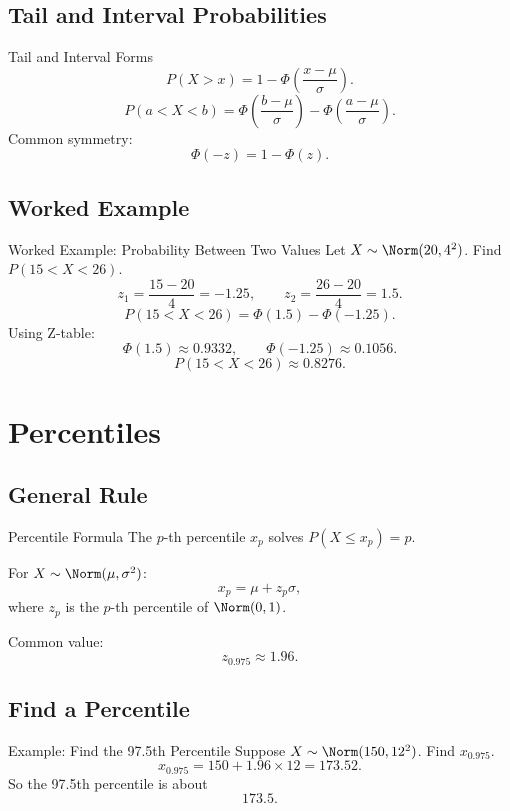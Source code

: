 \documentclass[aspectratio=169]{beamer}
\begin{document}
\subsection{Tail and Interval Probabilities}
\begin{frame}{Tail and Interval Forms}
  \[
    P(X>x)=1-\Phi\!\left(\frac{x-\mu}{\sigma}\right).
  \]
  \[
    P(a<X<b)=\Phi\!\left(\frac{b-\mu}{\sigma}\right)-\Phi\!\left(\frac{a-\mu}{\sigma}\right).
  \]
  \vspace{2mm}
  Common symmetry:
  \[
    \Phi(-z)=1-\Phi(z).
  \]
\end{frame}

\subsection{Worked Example}
\begin{frame}{Worked Example: Probability Between Two Values}
  Let \(X\sim\Norm(20,4^2)\). Find \(P(15<X<26)\).
  \[
    z_1=\frac{15-20}{4}=-1.25,\qquad z_2=\frac{26-20}{4}=1.5.
  \]
  \[
    P(15<X<26)=\Phi(1.5)-\Phi(-1.25).
  \]
  Using Z-table:
  \[
    \Phi(1.5)\approx0.9332,\qquad \Phi(-1.25)\approx0.1056.
  \]
  \[
    P(15<X<26)\approx0.8276.
  \]
\end{frame}

\section{Percentiles}

\subsection{General Rule}
\begin{frame}{Percentile Formula}
  The \(p\)-th percentile \(x_p\) solves \(P(X\le x_p)=p\).

  For \(X\sim\Norm(\mu,\sigma^2)\):
  \[
    x_p=\mu+z_p\sigma,
  \]
  where \(z_p\) is the \(p\)-th percentile of \(\Norm(0,1)\).

  Common value:
  \[
    z_{0.975}\approx1.96.
  \]
\end{frame}

\subsection{Find a Percentile}
\begin{frame}{Example: Find the 97.5th Percentile}
  Suppose \(X\sim\Norm(150,12^2)\). Find \(x_{0.975}\).
  \[
    x_{0.975}=150+1.96\times12=173.52.
  \]
  So the 97.5th percentile is about
  \[
    173.5.
  \]
\end{frame}
\end{document}
